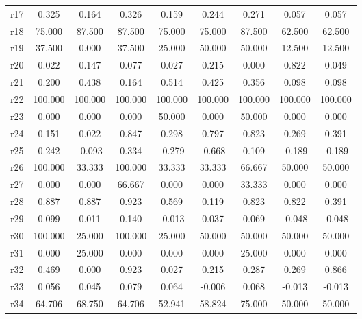\begin{table}[htbp]
\begin{tabular}{lcccccccc}
r17 &     0.325 &     0.164 &     0.326 &     0.159 &     0.244 &     0.271 &     0.057 &     0.057 \\  
r18 &    75.000 &    87.500 &    87.500 &    75.000 &    75.000 &    87.500 &    62.500 &    62.500 \\  
r19 &    37.500 &     0.000 &    37.500 &    25.000 &    50.000 &    50.000 &    12.500 &    12.500 \\  
r20 &     0.022 &     0.147 &     0.077 &     0.027 &     0.215 &     0.000 &     0.822 &     0.049 \\  
r21 &     0.200 &     0.438 &     0.164 &     0.514 &     0.425 &     0.356 &     0.098 &     0.098 \\  
r22 &   100.000 &   100.000 &   100.000 &   100.000 &   100.000 &   100.000 &   100.000 &   100.000 \\  
r23 &     0.000 &     0.000 &     0.000 &    50.000 &     0.000 &    50.000 &     0.000 &     0.000 \\  
r24 &     0.151 &     0.022 &     0.847 &     0.298 &     0.797 &     0.823 &     0.269 &     0.391 \\  
r25 &     0.242 &    -0.093 &     0.334 &    -0.279 &    -0.668 &     0.109 &    -0.189 &    -0.189 \\  
r26 &   100.000 &    33.333 &   100.000 &    33.333 &    33.333 &    66.667 &    50.000 &    50.000 \\  
r27 &     0.000 &     0.000 &    66.667 &     0.000 &     0.000 &    33.333 &     0.000 &     0.000 \\  
r28 &     0.887 &     0.887 &     0.923 &     0.569 &     0.119 &     0.823 &     0.822 &     0.391 \\  
r29 &     0.099 &     0.011 &     0.140 &    -0.013 &     0.037 &     0.069 &    -0.048 &    -0.048 \\  
r30 &   100.000 &    25.000 &   100.000 &    25.000 &    50.000 &    50.000 &    50.000 &    50.000 \\  
r31 &     0.000 &    25.000 &     0.000 &     0.000 &     0.000 &    25.000 &     0.000 &     0.000 \\  
r32 &     0.469 &     0.000 &     0.923 &     0.027 &     0.215 &     0.287 &     0.269 &     0.866 \\  
r33 &     0.056 &     0.045 &     0.079 &     0.064 &    -0.006 &     0.068 &    -0.013 &    -0.013 \\  
r34 &    64.706 &    68.750 &    64.706 &    52.941 &    58.824 &    75.000 &    50.000 &    50.000 \\  

\end{tabular}
\end{table}
